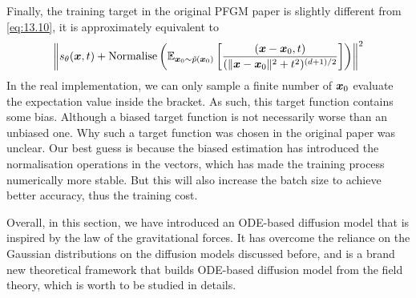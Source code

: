 Finally, the training target in the original PFGM paper is slightly different from \cref{eq:13.10}, it is approximately equivalent to
\begin{equation}
    \label{eq:13.12}
    \left\| s_\theta(\bm{x},t) + \mbox{Normalise}\left(   \mathbb{E}_{\bm{x}_0\sim\tilde{p}(\bm{x}_{0})} \left[  \frac{(\bm{x}-\bm{x}_0,t)}{(\|\bm{x}-\bm{x}_0\|^2+t^2)^{(d+1)/2}}\right]\right)\right\|^2
\end{equation}
In the real implementation, we can only sample a finite number of $\bm{x}_0$ evaluate the expectation value inside the bracket. As such, this target function contains some bias. Although a biased target function is not necessarily worse than an unbiased one. Why such a target function was chosen in the original paper was unclear. Our best guess is because the biased estimation has introduced the normalisation operations in the vectors, which has made the training process numerically more stable. But this will also increase the batch size to achieve better accuracy, thus the training cost.

Overall, in this section, we have introduced an ODE-based diffusion model that is inspired by the law of the gravitational forces. It has overcome the reliance on the Gaussian distributions on the diffusion models discussed before, and is a brand new theoretical framework that builds ODE-based diffusion model from the field theory, which is worth to be studied in details.